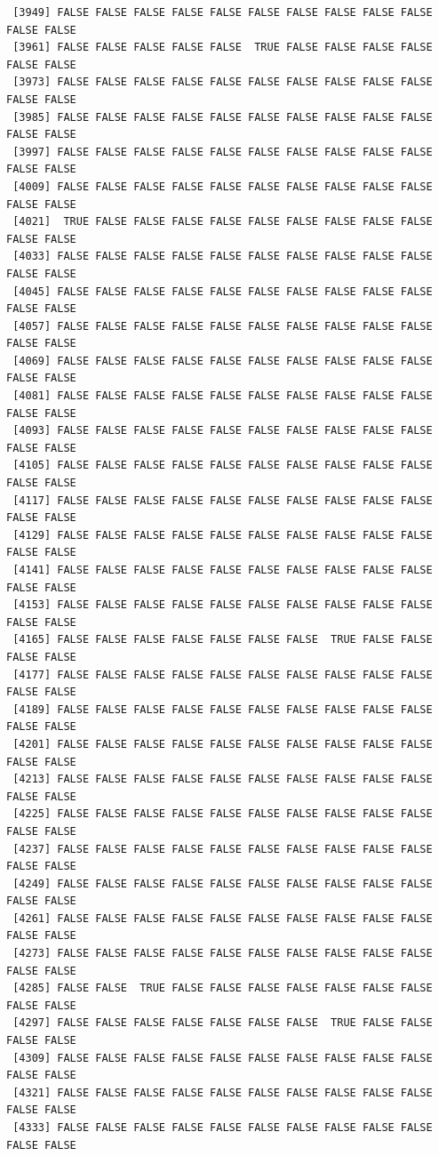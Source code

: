 \documentclass[
  a4paper,
  DIV=11,
  numbers=noendperiod]{scrartcl}
\begin{document}
\begin{verbatim}
 [3949] FALSE FALSE FALSE FALSE FALSE FALSE FALSE FALSE FALSE FALSE FALSE FALSE
 [3961] FALSE FALSE FALSE FALSE FALSE  TRUE FALSE FALSE FALSE FALSE FALSE FALSE
 [3973] FALSE FALSE FALSE FALSE FALSE FALSE FALSE FALSE FALSE FALSE FALSE FALSE
 [3985] FALSE FALSE FALSE FALSE FALSE FALSE FALSE FALSE FALSE FALSE FALSE FALSE
 [3997] FALSE FALSE FALSE FALSE FALSE FALSE FALSE FALSE FALSE FALSE FALSE FALSE
 [4009] FALSE FALSE FALSE FALSE FALSE FALSE FALSE FALSE FALSE FALSE FALSE FALSE
 [4021]  TRUE FALSE FALSE FALSE FALSE FALSE FALSE FALSE FALSE FALSE FALSE FALSE
 [4033] FALSE FALSE FALSE FALSE FALSE FALSE FALSE FALSE FALSE FALSE FALSE FALSE
 [4045] FALSE FALSE FALSE FALSE FALSE FALSE FALSE FALSE FALSE FALSE FALSE FALSE
 [4057] FALSE FALSE FALSE FALSE FALSE FALSE FALSE FALSE FALSE FALSE FALSE FALSE
 [4069] FALSE FALSE FALSE FALSE FALSE FALSE FALSE FALSE FALSE FALSE FALSE FALSE
 [4081] FALSE FALSE FALSE FALSE FALSE FALSE FALSE FALSE FALSE FALSE FALSE FALSE
 [4093] FALSE FALSE FALSE FALSE FALSE FALSE FALSE FALSE FALSE FALSE FALSE FALSE
 [4105] FALSE FALSE FALSE FALSE FALSE FALSE FALSE FALSE FALSE FALSE FALSE FALSE
 [4117] FALSE FALSE FALSE FALSE FALSE FALSE FALSE FALSE FALSE FALSE FALSE FALSE
 [4129] FALSE FALSE FALSE FALSE FALSE FALSE FALSE FALSE FALSE FALSE FALSE FALSE
 [4141] FALSE FALSE FALSE FALSE FALSE FALSE FALSE FALSE FALSE FALSE FALSE FALSE
 [4153] FALSE FALSE FALSE FALSE FALSE FALSE FALSE FALSE FALSE FALSE FALSE FALSE
 [4165] FALSE FALSE FALSE FALSE FALSE FALSE FALSE  TRUE FALSE FALSE FALSE FALSE
 [4177] FALSE FALSE FALSE FALSE FALSE FALSE FALSE FALSE FALSE FALSE FALSE FALSE
 [4189] FALSE FALSE FALSE FALSE FALSE FALSE FALSE FALSE FALSE FALSE FALSE FALSE
 [4201] FALSE FALSE FALSE FALSE FALSE FALSE FALSE FALSE FALSE FALSE FALSE FALSE
 [4213] FALSE FALSE FALSE FALSE FALSE FALSE FALSE FALSE FALSE FALSE FALSE FALSE
 [4225] FALSE FALSE FALSE FALSE FALSE FALSE FALSE FALSE FALSE FALSE FALSE FALSE
 [4237] FALSE FALSE FALSE FALSE FALSE FALSE FALSE FALSE FALSE FALSE FALSE FALSE
 [4249] FALSE FALSE FALSE FALSE FALSE FALSE FALSE FALSE FALSE FALSE FALSE FALSE
 [4261] FALSE FALSE FALSE FALSE FALSE FALSE FALSE FALSE FALSE FALSE FALSE FALSE
 [4273] FALSE FALSE FALSE FALSE FALSE FALSE FALSE FALSE FALSE FALSE FALSE FALSE
 [4285] FALSE FALSE  TRUE FALSE FALSE FALSE FALSE FALSE FALSE FALSE FALSE FALSE
 [4297] FALSE FALSE FALSE FALSE FALSE FALSE FALSE  TRUE FALSE FALSE FALSE FALSE
 [4309] FALSE FALSE FALSE FALSE FALSE FALSE FALSE FALSE FALSE FALSE FALSE FALSE
 [4321] FALSE FALSE FALSE FALSE FALSE FALSE FALSE FALSE FALSE FALSE FALSE FALSE
 [4333] FALSE FALSE FALSE FALSE FALSE FALSE FALSE FALSE FALSE FALSE FALSE FALSE

\end{verbatim}
\end{document}
